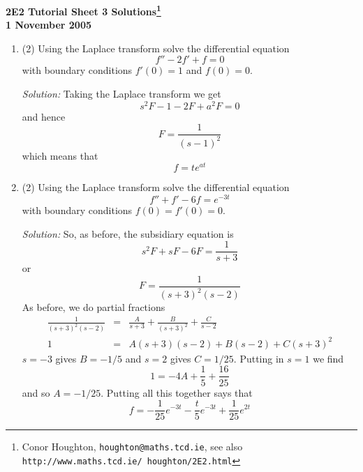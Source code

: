 \documentclass[12pt]{article}
\begin{document}
\begin{center}

{\bf 2E2 Tutorial Sheet 3 Solutions\footnote{Conor Houghton, {\tt houghton@maths.tcd.ie}, see also {\tt http://www.maths.tcd.ie/ houghton/2E2.html}}\\[1cm] 1 November 2005}
\end{center}


\renewcommand{\labelenumi}{\arabic{enumi}.}


\begin{enumerate}

\item (2)
Using the Laplace transform solve the differential equation
\begin{equation}
f''-2f'+f=0
\end{equation}
with boundary conditions $f'(0)=1$ and $f(0)=0$.

\noindent\textit{Solution:} Taking the Laplace transform we get
\begin{equation}
s^2F-1-2F+a^2F=0
\end{equation}
and hence
\begin{equation}
F=\frac{1}{(s-1)^2}
\end{equation}
which means that 
\begin{equation}
f=te^{at}
\end{equation}


\item (2)
Using the Laplace transform solve the differential equation
\begin{equation}
f''+f'-6f=e^{-3t}
\end{equation}
with boundary conditions $f(0)=f'(0)=0$.

\noindent\textit{Solution:} So, as before, the subsidiary equation is
\begin{equation}
s^2F+sF-6F=\frac{1}{s+3}
\end{equation}
or 
\begin{equation}
F=\frac{1}{(s+3)^2(s-2)}
\end{equation}
As before, we do partial fractions
\begin{eqnarray}
\frac{1}{(s+3)^2(s-2)}&=&\frac{A}{s+3}+\frac{B}{(s+3)^2}+\frac{C}{s-2}\nonumber\\
1&=&A(s+3)(s-2)+B(s-2)+C(s+3)^2
\end{eqnarray}
$s=-3$ gives $B=-1/5$ and $s=2$ gives $C=1/25$. Putting in $s=1$ we find
\begin{equation}
1=-4A+\frac{1}{5}+\frac{16}{25}
\end{equation}
and so $A=-1/25$. Putting all this together says that
\begin{equation}
f=-\frac{1}{25}e^{-3t}-\frac{t}{5}e^{-3t}+\frac{1}{25}e^{2t}
\end{equation}



\end{enumerate}
\end{document}
